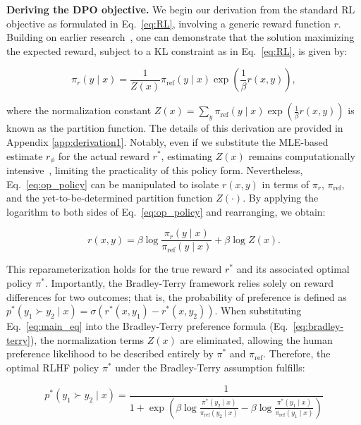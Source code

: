 \textbf{Deriving the DPO objective.} We begin our derivation from the standard RL objective as formulated in Eq.~\ref{eq:RL}, involving a generic reward function $r$. Building on earlier research~\citep{peters2007reinforcement, peng2019advantage, korbak2022reinforcement, go2023aligning}, one can demonstrate that the solution maximizing the expected reward, subject to a KL constraint as in Eq.~\ref{eq:RL}, is given by:

\begin{equation}\label{eq:op_policy}
    \pi_r(y\mid x) = \frac{1}{Z(x)}\pi_\text{ref}(y\mid x)\exp\left(\frac{1}{\beta}r(x, y)\right),
\end{equation}

where the normalization constant $Z(x) =\sum_{y}\pi_\text{ref}(y\mid x)\exp\left(\frac{1}{\beta}r(x, y)\right)$ is known as the partition function. The details of this derivation are provided in Appendix \ref{app:derivation1}. Notably, even if we substitute the MLE-based estimate $r_{\phi}$ for the actual reward $r^*$, estimating $Z(x)$ remains computationally intensive~\citep{korbak2022reinforcement, go2023aligning}, limiting the practicality of this policy form. Nevertheless, Eq.~\ref{eq:op_policy} can be manipulated to isolate $r(x,y)$ in terms of $\pi_r$, $\pi_\text{ref}$, and the yet-to-be-determined partition function $Z(\cdot)$. By applying the logarithm to both sides of Eq.~\ref{eq:op_policy} and rearranging, we obtain:

\begin{equation}\label{eq:main_eq}
    r(x,y) =\beta \log \frac{\pi_r(y\mid x)}{\pi_\text{ref}(y\mid x)} + \beta \log Z(x).
\end{equation}

This reparameterization holds for the true reward $r^*$ and its associated optimal policy $\pi^*$. Importantly, the Bradley-Terry framework relies solely on reward differences for two outcomes; that is, the probability of preference is defined as ${p^*(y_1 \succ y_2 \mid x) = \sigma(r^*(x, y_1) - r^*(x, y_2))}$. When substituting Eq.~\ref{eq:main_eq} into the Bradley-Terry preference formula (Eq.~\ref{eq:bradley-terry}), the normalization terms $Z(x)$ are eliminated, allowing the human preference likelihood to be described entirely by $\pi^*$ and $\pi_\text{ref}$. Therefore, the optimal RLHF policy $\pi^*$ under the Bradley-Terry assumption fulfills:

\begin{equation}\label{eq:objective}
    p^*(y_1\succ y_2 \mid x)=\frac{1}{1 + \exp\left(\beta \log \frac{\pi^*(y_2\mid x)}{\pi_\text{ref}(y_2\mid x)} - \beta \log \frac{\pi^*(y_1\mid x)}{\pi_\text{ref}(y_1\mid x)}\right)}
\end{equation}

